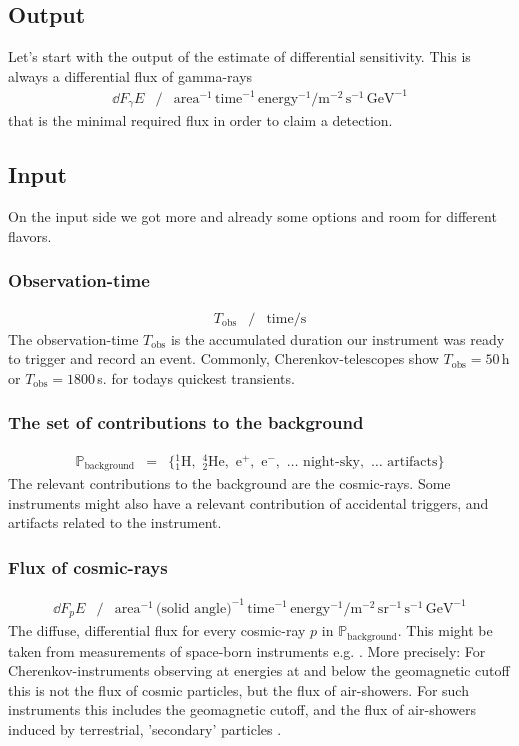 \documentclass{article}%
\begin{document}
\subsection{Output}
%
Let's start with the output of the estimate of differential sensitivity.
%
This is always a differential flux of gamma-rays
%
\begin{eqnarray*}
\dd{F_\gamma}{E} &/&
\text{area}^{-1}\,\text{time}^{-1}\,\text{energy}^{-1} /
\text{m}^{-2}\,\text{s}^{-1}\,\text{GeV}^{-1}
\end{eqnarray*}
%
that is the minimal required flux in order to claim a detection.
%
\subsection{Input}
%
On the input side we got more and already some options and room for different flavors.
%
\subsubsection*{Observation-time}
%
\begin{eqnarray*}
T_\text{obs} &/& \text{time} / \text{s}
\end{eqnarray*}
%
The observation-time $T_\text{obs}$ is the accumulated duration our instrument was ready to trigger and record an event.
%
Commonly, Cherenkov-telescopes show $T_\text{obs} = 50\,$h or $T_\text{obs} = 1800\,$s. for todays quickest transients.
%
\subsubsection*{The set of contributions to the background}
%
\begin{eqnarray*}
\mathbb{P}_\text{background} &=& \{
{_1^1}\text{H},\,\,
{_2^4}\text{He},\,\,
\text{e}^{+},\,\,
\text{e}^{-},\,\,
\dots{}\,\,
\text{night-sky},\,\,
\dots{}\,\,
\text{artifacts}
\}
\end{eqnarray*}
%
The relevant contributions to the background are the cosmic-rays. Some instruments might also have a relevant contribution of accidental triggers, and artifacts related to the instrument.
%
\subsubsection*{Flux of cosmic-rays}
%
\begin{eqnarray*}
\dd{F_p}{E} &/&
\text{area}^{-1}\,\text{(solid angle)}^{-1}\,\text{time}^{-1}\,\text{energy}^{-1} /
\text{m}^{-2}\,\text{sr}^{-1}\,\text{s}^{-1}\,\text{GeV}^{-1}
\end{eqnarray*}
The diffuse, differential flux for every cosmic-ray $p$ in $\mathbb{P}_\text{background}$. This might be taken from measurements of space-born instruments e.g. \cite{aguilar2014precision,aguilar2015precision}.
%
More precisely: For Cherenkov-instruments observing at energies at and below the geomagnetic cutoff this is not the flux of cosmic particles, but the flux of air-showers.
%
For such instruments this includes the geomagnetic cutoff, and the flux of air-showers induced by terrestrial, 'secondary' particles \cite{lipari2002fluxes}.
%
\end{document}
